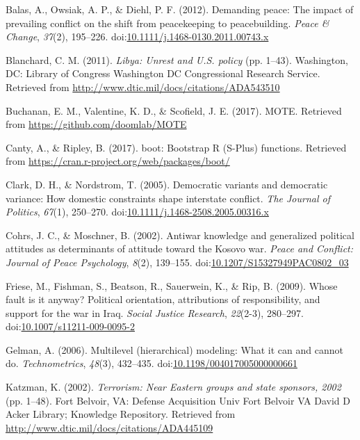 \documentclass[
  english,
  ,man,floatsintext]{apa6}
\begin{document}
\leavevmode\hypertarget{ref-Balas2012}{}%
Balas, A., Owsiak, A. P., \& Diehl, P. F. (2012). Demanding peace: The impact of prevailing conflict on the shift from peacekeeping to peacebuilding. \emph{Peace \& Change}, \emph{37}(2), 195--226. doi:\href{https://doi.org/10.1111/j.1468-0130.2011.00743.x}{10.1111/j.1468-0130.2011.00743.x}

\leavevmode\hypertarget{ref-Blanchard2011}{}%
Blanchard, C. M. (2011). \emph{Libya: Unrest and U.S. policy} (pp. 1--43). Washington, DC: Library of Congress Washington DC Congressional Research Service. Retrieved from \url{http://www.dtic.mil/docs/citations/ADA543510}

\leavevmode\hypertarget{ref-Buchanan2017}{}%
Buchanan, E. M., Valentine, K. D., \& Scofield, J. E. (2017). MOTE. Retrieved from \url{https://github.com/doomlab/MOTE}

\leavevmode\hypertarget{ref-Canty2017}{}%
Canty, A., \& Ripley, B. (2017). boot: Bootstrap R (S-Plus) functions. Retrieved from \url{https://cran.r-project.org/web/packages/boot/}

\leavevmode\hypertarget{ref-Clark2005}{}%
Clark, D. H., \& Nordstrom, T. (2005). Democratic variants and democratic variance: How domestic constraints shape interstate conflict. \emph{The Journal of Politics}, \emph{67}(1), 250--270. doi:\href{https://doi.org/10.1111/j.1468-2508.2005.00316.x}{10.1111/j.1468-2508.2005.00316.x}

\leavevmode\hypertarget{ref-Cohrs2002}{}%
Cohrs, J. C., \& Moschner, B. (2002). Antiwar knowledge and generalized political attitudes as determinants of attitude toward the Kosovo war. \emph{Peace and Conflict: Journal of Peace Psychology}, \emph{8}(2), 139--155. doi:\href{https://doi.org/10.1207/S15327949PAC0802_03}{10.1207/S15327949PAC0802\_03}

\leavevmode\hypertarget{ref-Friese2009}{}%
Friese, M., Fishman, S., Beatson, R., Sauerwein, K., \& Rip, B. (2009). Whose fault is it anyway? Political orientation, attributions of responsibility, and support for the war in Iraq. \emph{Social Justice Research}, \emph{22}(2-3), 280--297. doi:\href{https://doi.org/10.1007/s11211-009-0095-2}{10.1007/s11211-009-0095-2}

\leavevmode\hypertarget{ref-Gelman2006}{}%
Gelman, A. (2006). Multilevel (hierarchical) modeling: What it can and cannot do. \emph{Technometrics}, \emph{48}(3), 432--435. doi:\href{https://doi.org/10.1198/004017005000000661}{10.1198/004017005000000661}

\leavevmode\hypertarget{ref-Katzman2002}{}%
Katzman, K. (2002). \emph{Terrorism: Near Eastern groups and state sponsors, 2002} (pp. 1--48). Fort Belvoir, VA: Defense Acquisition Univ Fort Belvoir VA David D Acker Library; Knowledge Repository. Retrieved from \url{http://www.dtic.mil/docs/citations/ADA445109}
\end{document}
